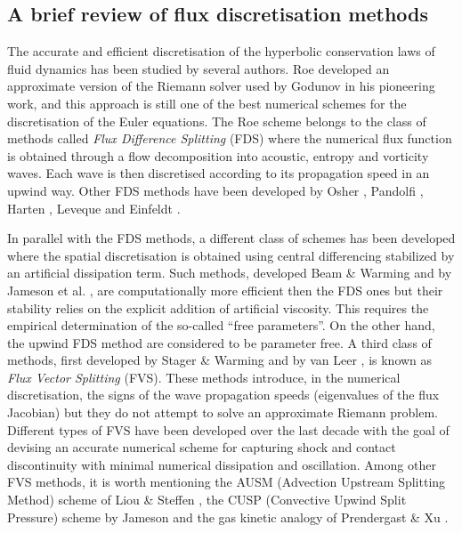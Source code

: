 \subsection{A brief review of flux discretisation methods}
\label{flux_discretisation.sec}
%
 The accurate and efficient discretisation of the hyperbolic conservation
 laws of fluid dynamics has been studied by several authors.
 Roe \citeyear{Roe:1} developed an approximate version of the Riemann solver
 used by Godunov \citeyear{Godunov:1} in his pioneering work,
 and this approach is still one of the best numerical schemes
 for the discretisation of the Euler equations.
 The Roe scheme belongs to the class of methods called
 {\em Flux Difference Splitting} (FDS) where
 the numerical flux function is obtained through a flow decomposition into
 acoustic, entropy and vorticity waves. Each wave is
 then discretised according to its propagation speed in an upwind
 way.
 Other FDS methods have been developed by Osher \citeyear{Osher:1}, Pandolfi
 \citeyear{Pandolfi}, Harten \citeyear{Harten:2}, Leveque \citeyear{Leveque:1}
 and Einfeldt \citeyear{Einfeldt:1,Einfeldt:2}.
 
 In parallel with the FDS methods, a different class of schemes has been developed
 where the spatial discretisation is obtained using central
 differencing stabilized by an artificial dissipation term.
 Such methods, developed Beam \& Warming \citeyear{Beam:1}
 and by Jameson et al. \citeyear{Jame:1},
 are computationally more efficient then the FDS ones but their stability
 relies on the explicit addition of artificial viscosity.
 This requires the empirical determination of the so-called
 ``free parameters''.
 On the other hand, the upwind FDS method are considered to be parameter
 free.
 A third class of methods, first developed by Stager \& Warming
 \citeyear{Stager:1} and by van Leer \citeyear{Leer:5}, is known as
 {\em Flux Vector Splitting} (FVS).
 These methods introduce, in the numerical discretisation, the signs
 of the wave propagation speeds (eigenvalues of the flux Jacobian)
 but they do not attempt to solve an approximate Riemann problem.
 Different types of FVS have been developed over the last decade
 with the goal of devising an accurate numerical scheme for capturing
 shock and contact discontinuity with minimal numerical dissipation
 and oscillation.
 Among other FVS methods, it is worth mentioning the AUSM (Advection
 Upstream Splitting Method) scheme of Liou \& Steffen \citeyear{Liou:1,Liou:2},
 the CUSP (Convective Upwind Split Pressure) scheme by
 Jameson \citeyear{Jame:2,Jame:7} and the gas kinetic analogy of
 Prendergast \& Xu \citeyear{Prendergast:1}.
 
